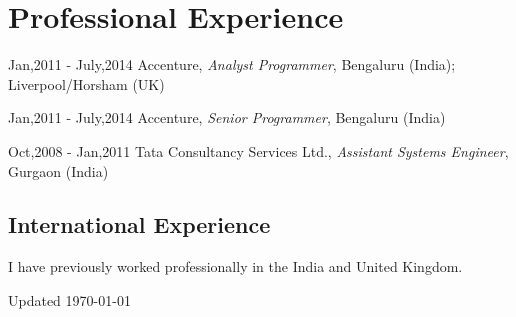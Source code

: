 \documentclass[12pt,letterpaper]{article}
\newcommand{\listitemspace}{0.15em}
\renewenvironment{itemize}
{\begin{list}{}{\setlength{\leftmargin}{0em}
				\setlength{\parskip}{0em}
				\setlength{\itemsep}{\listitemspace}
				\setlength{\parsep}{\listitemspace}}}
{\end{list}}
\begin{document}
\section*{Professional Experience}


\begin{tablist}
	
	\item[Jan,2011 - July,2014] \tab Accenture, \textit{Analyst Programmer}, Bengaluru (India); Liverpool/Horsham (UK)
	
	\item[Jan,2011 - July,2014] \tab Accenture, \textit{Senior Programmer}, Bengaluru (India)
	
	
	\item[Oct,2008 - Jan,2011] \tab Tata Consultancy Services Ltd., \textit{Assistant Systems Engineer}, Gurgaon (India)
	
\end{tablist}

\subsection*{International Experience}

\begin{itemize}
	
	\item I have previously worked professionally in the India and United Kingdom.
	
\end{itemize}



\begin{center}
	\vspace{6em}
	Updated \monthyeardate\today
\end{center}
\end{document}
